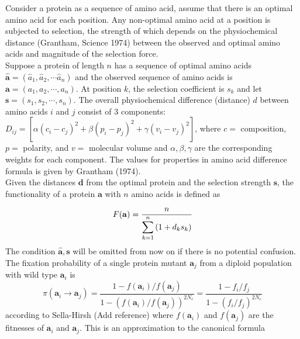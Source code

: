 \documentclass[13pt]{article}
\begin{document}
Consider a protein as a sequence of amino acid, assume that there is an optimal amino acid for each position. Any non-optimal amino acid at a position is subjected to selection, the strength of which depends on the physiochemical distance (Grantham, Science 1974) between the observed and optimal amino acids and magnitude of the selection force. \\

Suppose a protein of length $n$ has a sequence of optimal amino acids $\hat{\mathbf{a}} = (\hat{a}_1, \hat{a}_2, \cdots \hat{a}_n)$  and the observed sequence of amino acids is $\mathbf{a} = (a_1, a_2, \cdots, a_n)$. At position $k$, the selection coefficient is $s_k$ and let $\mathbf{s}=(s_1,s_2,\cdots,s_n)$. The overall physiochemical difference (distance) $d$ between amino acids $i$ and $j$ consist of 3 components: $D_{ij} = [\alpha (c_i-c_j)^2 + \beta (p_i - p_j)^2 + \gamma (v_i - v_j)^2]$, where $c = $ composition, $p = $ polarity, and $v = $ molecular volume and $\alpha, \beta, \gamma$ are the corresponding weights for each component. The values for properties in amino acid difference formula is given by Grantham (1974). \\

Given the distances $\mathbf{d}$ from the optimal protein and the selection strength $\mathbf{s}$, the functionality of a protein $\mathbf{a}$ with $n$ amino acids is defined as

\begin{equation}
F(\mathbf{a})  =  \frac{n}{\displaystyle  \sum_{k=1}^n{(1+d_ks_k)}} \label{eq:harmonic}\\
\end{equation}
The condition $\hat{\mathbf{a}},\mathbf{s}$ will be omitted from now on if there is no potential confusion.\\

The fixation probability of a single protein mutant $\mathbf{a}_j$ from a diploid population with wild type $\mathbf{a}_i$ is 
\begin{equation}
\pi(\mathbf{a}_i \rightarrow \mathbf{a}_j ) = \frac{1-f(\mathbf{a}_i)/f(\mathbf{a}_j)}{1-(f(\mathbf{a}_i)/f(\mathbf{a}_j))^{2N_e}} = \frac{1-f_i/f_j}{1-(f_i/f_j)^{2N_e}}
\label{eq:fixation}
\end{equation}
according to Sella-Hirsh (Add reference)
where $f(\mathbf{a}_i)$ and $f(\mathbf{a}_j)$ are the fitnesses of $\mathbf{a}_i$ and $\mathbf{a}_j$. This is an approximation to the canonical formula 
\end{document}
